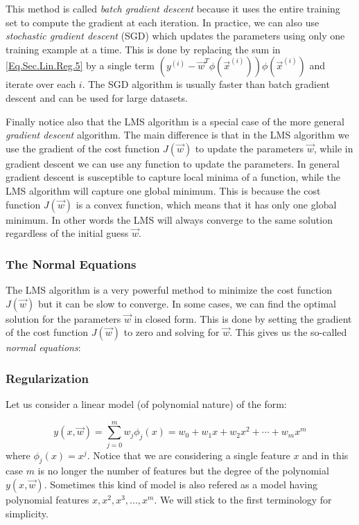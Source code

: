 \begin{remark}
	This method is called \emph{batch gradient descent} because it uses the entire training set to compute the gradient at each iteration. In practice, we can also use \emph{stochastic gradient descent} (SGD) which updates the parameters using only one training example at a time. This is done by replacing the sum in \cref{Eq.Sec.Lin.Reg.5} by a single term $(y^{(i)} - \vec{w}^T\phi(\vec{x}^{(i)}))\phi(\vec{x}^{(i)})$ and iterate over each $i$. The SGD algorithm is usually faster than batch gradient descent and can be used for large datasets. 
\end{remark}

Finally notice also that the LMS algorithm is a special case of the more general \emph{gradient descent} algorithm. The main difference is that in the LMS algorithm we use the gradient of the cost function $J(\vec{w})$ to update the parameters $\vec{w}$, while in gradient descent we can use any function to update the parameters. In general gradient descent is susceptible to capture local minima of a function, while the LMS algorithm will capture one global minimum. This is because the cost function $J(\vec{w})$ is a convex function, which means that it has only one global minimum. In other words the LMS will always converge to the same solution regardless of the initial guess $\vec{w}$. 

\subsubsection{The Normal Equations}
The LMS algorithm is a very powerful method to minimize the cost function $J(\vec{w})$ but it can be slow to converge. In some cases, we can find the optimal solution for the parameters $\vec{w}$ in closed form. This is done by setting the gradient of the cost function $J(\vec{w})$ to zero and solving for $\vec{w}$. This gives us the so-called \emph{normal equations}:


\subsubsection{Regularization}

Let us consider a linear model (of polynomial nature) of the form: 

\begin{equation}\label{Eq.Sec.Lin.Reg.9}
	y(x,\vec{w}) = \sum_{j=0}^{m}w_j\phi_j(x) = w_0 + w_1x + w_2x^2 + \cdots + w_m x^m 
\end{equation}
where $\phi_j(x)= x^j$. Notice that we are considering a single feature $x$ and in this case $m$ is no longer the number of features but the degree of the polynomial $y(x,\vec{w})$. Sometimes this kind of model is also refered as a model having polynomial features $x, x^2 ,x^3,...,x^m$. We will stick to the first terminology for simplicity. 

